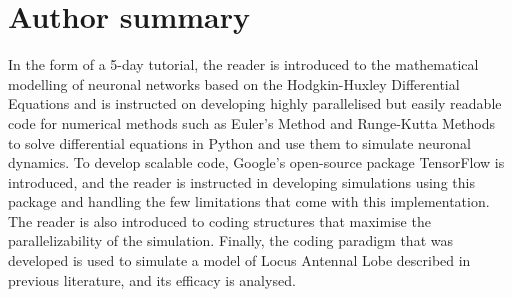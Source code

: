 \documentclass[10pt,letterpaper]{article}
\begin{document}
\section*{Author summary}
In the form of a 5-day tutorial, the reader is introduced to the mathematical modelling of neuronal networks based on the Hodgkin-Huxley Differential Equations and is instructed on developing highly parallelised but easily readable code for numerical methods such as Euler's Method and Runge-Kutta Methods to solve differential equations in Python and use them to simulate neuronal dynamics. To develop scalable code, Google's open-source package TensorFlow is introduced, and the reader is instructed in developing simulations using this package and handling the few limitations that come with this implementation. The reader is also introduced to coding structures that maximise the parallelizability of the simulation. Finally, the coding paradigm that was developed is used to simulate a model of Locus Antennal Lobe described in previous literature, and its efficacy is analysed. 

\linenumbers

\end{document}

